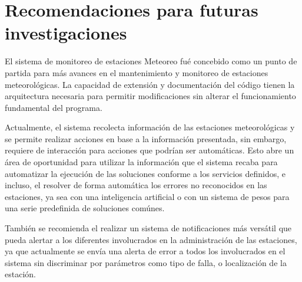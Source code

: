 
\section{Recomendaciones para futuras investigaciones}

El sistema de monitoreo de estaciones Meteoreo fué concebido como un punto de partida para más avances en el mantenimiento y monitoreo de estaciones meteorológicas. La capacidad de extensión y documentación del código tienen la arquitectura necesaria para permitir modificaciones sin alterar el funcionamiento fundamental del programa.

Actualmente, el sistema recolecta información de las estaciones meteorológicas y se permite realizar acciones en base a la información presentada, sin embargo, requiere de interacción para acciones que podrían ser automáticas. Esto abre un área de oportunidad para utilizar la información que el sistema recaba para automatizar la ejecución de las soluciones conforme a los servicios definidos, e incluso, el resolver de forma automática los errores no reconocidos en las estaciones, ya sea con una inteligencia artificial o con un sistema de pesos para una serie predefinida de soluciones comúnes.


También se recomienda el realizar un sistema de notificaciones más versátil que pueda alertar a los diferentes involucrados en la administración de las estaciones, ya que actualmente se envía una alerta de error a todos los involucrados en el sistema sin discriminar por parámetros como tipo de falla, o localización de la estación.




